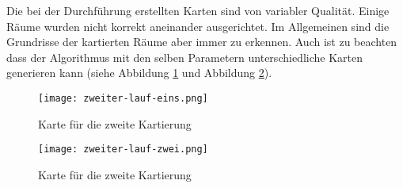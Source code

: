 Die bei der Durchführung erstellten Karten sind von variabler Qualität. Einige Räume wurden nicht korrekt aneinander ausgerichtet. Im Allgemeinen sind die Grundrisse der kartierten Räume aber immer zu erkennen. Auch ist zu beachten dass der Algorithmus mit den selben Parametern unterschiedliche Karten generieren kann (siehe Abbildung \ref{fig:zweiter-lauf-eins} und Abbildung \ref{fig:zweiter-lauf-zwei}).

\begin{figure}[!htb]
	\centering
	\texttt{[image: zweiter-lauf-eins.png]}
	\caption{Karte für die zweite Kartierung}
	\label{fig:zweiter-lauf-eins}
\end{figure}

\begin{figure}[!htb]
	\centering
	\texttt{[image: zweiter-lauf-zwei.png]}
	\caption{Karte für die zweite Kartierung}
	\label{fig:zweiter-lauf-zwei}
\end{figure}

